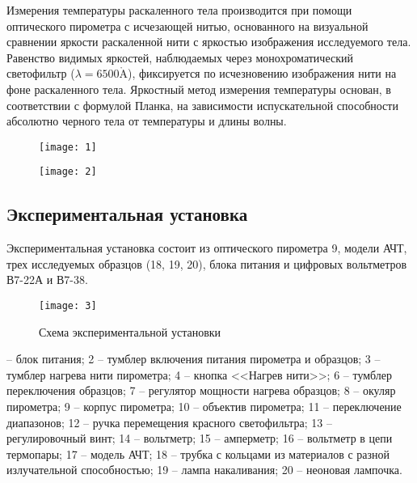 \documentclass[a4paper, 12pt]{article}
\begin{document}
Измерения температуры раскаленного тела производится при помощи
оптического пирометра с исчезающей нитью, основанного на визуальной
сравнении яркости раскаленной нити с яркостью изображения исследуемого
тела. Равенство видимых яркостей, наблюдаемых через монохроматический
светофильтр ($\lambda = 6500 \mathring{\text{A}}$), фиксируется по
исчезновению изображения нити на фоне раскаленного тела. Яркостный
метод измерения температуры основан, в соответствии с формулой Планка,
на зависимости испускательной способности абсолютно черного тела от
температуры и длины волны.


\begin{figure}[H]
    \begin{floatrow}

        {
        \texttt{[image: 1]}
        \label{fig:1}
    }

        {
        \texttt{[image: 2]}
        \label{fig:2}
    }
    \end{floatrow}
\end{figure}
\subsection{Экспериментальная установка}

Экспериментальная установка  состоит из оптического
пирометра 9, модели АЧТ, трех исследуемых образцов (18, 19, 20), блока
питания и цифровых вольтметров В7-22А и В7-38.


\begin{figure}[H]
    \texttt{[image: 3]} 
    \caption{
        Схема экспериментальной установки
    }
    \label{fig:3}
\end{figure}
 -- блок питания; 2 -- тумблер включения питания пирометра и
образцов; 3 -- тумблер нагрева нити пирометра; 4 -- кнопка <<Нагрев
нити>>; 6 -- тумблер переключения образцов; 7 -- регулятор мощности
нагрева образцов; 8 -- окуляр пирометра; 9 -- корпус пирометра; 10 --
объектив пирометра; 11 -- переключение диапазонов; 12 -- ручка
перемещения красного светофильтра; 13 -- регулировочный винт; 14 --
вольтметр; 15 -- амперметр; 16 -- вольтметр в цепи термопары; 17 --
модель АЧТ; 18 -- трубка с кольцами из материалов с разной
излучательной способностью; 19 -- лампа накаливания; 20 -- неоновая
лампочка.
\end{document}
